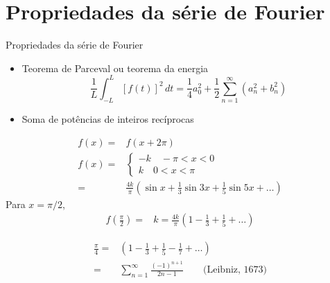       \section[ slide = true]{Propriedades da série de Fourier}
      \begin{slide}[toc = ]{Propriedades da série de Fourier}
		      \begin{itemize}
			      \item Teorema de Parceval ou teorema da energia
				      \begin{equation*}
					      \frac{1}{L} \int_{-L}^L [f(t)]^2\, dt = \frac{1}{4}a_0^2 + \frac{1}{2}\sum_{n=1}^\infty (a_n^2+b_n^2)	 
			      	      \end{equation*}
			      \item Soma de potências de inteiros recíprocas
		      \end{itemize}
	      \twocolumn
	      {
				      \begin{align*}
					      f(x) =& f(x+2\pi)\\
					      f(x) =& \begin{cases} -k \quad -\pi < x < 0\\k \quad 0<x<\pi\end{cases}\\
						   =& \frac{4k}{\pi}\left (\sin x + \frac{1}{3}\sin 3x + \frac{1}{5}\sin 5x  + \dots \right )
				      \end{align*}
				      Para $x = \pi/2$,
				      \begin{align*}
					      f\left (\frac{\pi}{2} \right ) =& k = \frac{4k}{\pi}\left (1 - \frac{1}{3} + \frac{1}{5} + \dots \right )
				      \end{align*}
	      }
	      {
		      \begin{align*}
			      \frac{\pi}{4} =&\left (1 - \frac{1}{3} + \frac{1}{5} - \frac{1}{7} + \dots \right )\\
					    =&\sum_{n=1}^\infty \frac{(-1)^{n+1}}{2n-1}\qquad \text{(Leibniz, 1673)}
		      \end{align*} 

	      }

      \end{slide}
